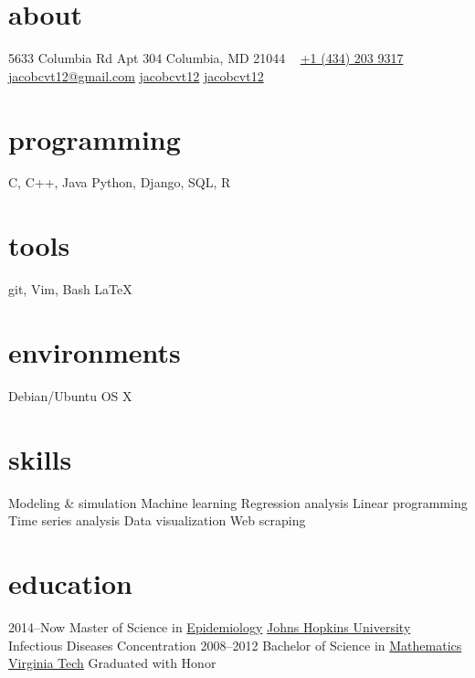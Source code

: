 \documentclass[]{friggeri-cv} %
\begin{document}



\begin{aside} %
\section{about}
5633 Columbia Rd
Apt 304
Columbia, MD 21044
~
\href{tel:14342039317}{\faPhone +1 (434) 203 9317}
\href{mailto:jacobcvt12@gmail.com}{\faEnvelope  jacobcvt12@gmail.com}
\href{https://github.com/jacobcvt12}{\faGithub jacobcvt12}
\href{https://www.linkedin.com/in/jacobcvt12}{\faLinkedin jacobcvt12}
\section{programming}
C, C++, Java
Python, Django,
SQL, R
\section{tools}
git, Vim, Bash
\LaTeX
\section{environments}
Debian/Ubuntu
OS X
\section{skills}
Modeling \& simulation
Machine learning
Regression analysis
Linear programming
Time series analysis
Data visualization
Web scraping
\end{aside}


\section{education}

\begin{entrylist}
\entry
{2014--Now}
{Master {\normalfont of Science in}
\href{http://www.jhsph.edu/departments/epidemiology/}{Epidemiology}}
{\href{http://www.jhu.edu}{Johns Hopkins University}}
{Infectious Diseases Concentration}
\entry
{2008--2012}
{Bachelor {\normalfont of Science in}
\href{https://www.math.vt.edu/}{Mathematics}}
{\href{http://www.vt.edu}{Virginia Tech}}
{Graduated with Honor}
\end{entrylist}
\end{document}
